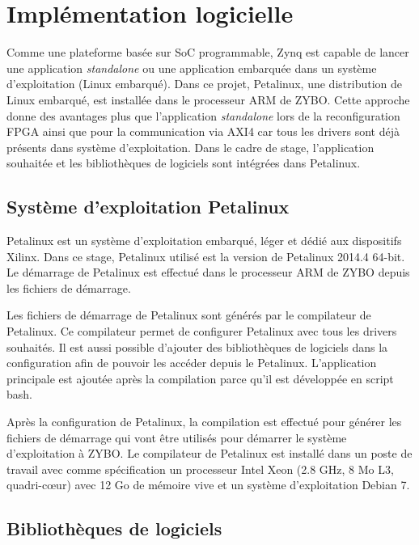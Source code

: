 \section{Implémentation logicielle}
\label{sec:logiciel}
Comme une plateforme basée sur SoC programmable, Zynq est capable de lancer une application \emph{standalone}
ou une application embarquée dans un système d'exploitation (Linux embarqué). Dans ce projet,
Petalinux, une distribution de Linux embarqué, est installée dans le processeur ARM de ZYBO.
Cette approche donne des avantages plus que l'application \emph{standalone} lors de la reconfiguration FPGA ainsi que pour la communication via
AXI4 car tous les drivers sont déjà présents dans système d'exploitation.
Dans le cadre de stage, l'application souhaitée et les bibliothèques de logiciels
sont intégrées dans Petalinux.

\subsection{Système d'exploitation Petalinux} %

Petalinux est un système d'exploitation embarqué, léger et dédié aux dispositifs Xilinx. 
Dans ce stage, Petalinux utilisé est la version de Petalinux 2014.4 64-bit.
Le démarrage de Petalinux est effectué dans le processeur ARM de ZYBO depuis
les fichiers de démarrage. 

Les fichiers de démarrage de Petalinux sont générés par le compilateur de Petalinux.
Ce compilateur permet de configurer Petalinux avec tous les drivers souhaités.
Il est aussi possible d'ajouter des bibliothèques de logiciels dans la configuration
afin de pouvoir les accéder depuis le Petalinux. 
L'application principale est ajoutée après la compilation parce qu'il est développée
en script bash.

Après la configuration de Petalinux, la compilation est effectué pour générer les fichiers de démarrage
qui vont être utilisés pour démarrer le système d'exploitation à ZYBO.
Le compilateur de Petalinux est installé dans un poste de travail avec comme spécification un 
processeur Intel Xeon (2.8 GHz, 8 Mo L3, quadri-cœur)
avec 12 Go de mémoire vive et un système d'exploitation Debian 7.

\subsection{Bibliothèques de logiciels} %
\label{subsec:embedded}

